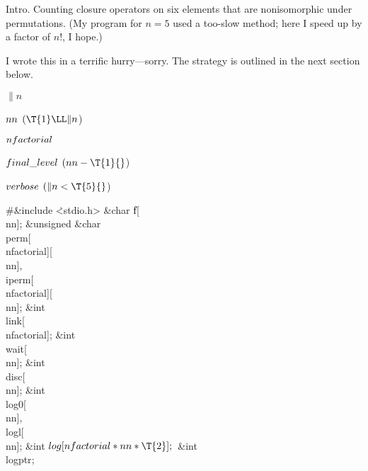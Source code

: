 
\srcloctrue
\datethis


Intro. Counting closure operators on six elements that
are nonisomorphic
under permutations. (My program for $n=5$ used a too-slow method;
here I speed up by a factor of $n!$, I hope.)

I wrote this in a terrific hurry---sorry. The strategy is outlined
in the next section below.

\Y\B\4\D$\|n$ \5
\par
\B\4\D$\\{nn}$ \5
$(\T{1}\LL\|n{}$)\par
\B\4\D$\\{nfactorial}$ \5
\par
\B\4\D$\\{final\_level}$ \5
$(\\{nn}-\T{1}{}$)\par
\B\4\D$\\{verbose}$ \5
$(\|n<\T{5}{}$)\par
\Y\B\8\#\&{include} \.{<stdio.h>}\6
\&{char} \|f[\\{nn}];\6
\&{unsigned} \&{char} \\{perm}[\\{nfactorial}][\\{nn}]${},{}$ \\{iperm}[%
\\{nfactorial}][\\{nn}];\6
\&{int} \\{link}[\\{nfactorial}];\6
\&{int} \\{wait}[\\{nn}];\6
\&{int} \\{disc}[\\{nn}];\6
\&{int} \\{log0}[\\{nn}]${},{}$ \\{logl}[\\{nn}];\6
\&{int} ${}\\{log}[\\{nfactorial}*\\{nn}*\T{2}];{}$\6
\&{int} \\{logptr};\6
